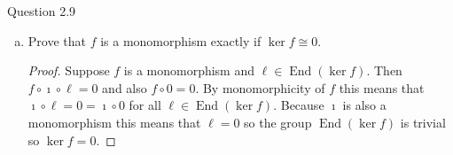 \documentclass{article}
\newcommand{\incl}{\imath}
\DeclareMathOperator{\coker}{coker}
\DeclareMathOperator{\End}{End}
\newenvironment{question}[1][]{\begin{paragraph}{Question #1}}{\end{paragraph}}
\theoremstyle{definition}
\begin{document}
\begin{question}[2.9]
\begin{enumerate}[a)]
\begin{proof}
                  Now consider two morphisms \(g,h:\coker\pi\to Z\) such that
                  \(\pi\circ g=\pi\circ h\) and consider the commutative diagram
                  in .
                  \begin{figure}[H]
                      \[
                          \begin{tikzcd}
                              X && Y && \coker\pi \\
                              \\
                              &&&& Z
                              \arrow["f", from=1-1, to=1-3]
                              \arrow["\pi", from=1-3, to=1-5]
                              \arrow["g"', shift right=1, from=1-5, to=3-5]
                              \arrow["h", shift left=1, from=1-5, to=3-5]
                              \arrow["{g\pi=h\pi}"', from=1-3, to=3-5]
                          \end{tikzcd}
                      \]
                      \caption{Another commutative diagram.}
                      \label{fig:cokernel-universal}
                  \end{figure}
                  Then by the universal property there is a unique map
                  \(\coker\pi\to Z\) such that the diagram commutes. This map
                  must be equal to both \(g\) and \(h\), so \(g=h\) and
                  therefore \(\pi\) is an epimorphism.
              \end{proof}

        \item Prove that \(f\) is a monomorphism exactly if \(\ker f\cong0\).

              \begin{proof}
                  Suppose \(f\) is a monomorphism and \(\ell\in\End(\ker f)\).
                  Then \(f\circ\incl\circ\ell=0\) and also \(f\circ 0=0\). By
                  monomorphicity of \(f\)  this means that
                  \(\incl\circ\ell=0=\incl\circ0\) for all \(\ell\in\End(\ker
                  f)\). Because \(\incl\) is also a monomorphism this means that
                  \(\ell=0\) so the group \(\End(\ker f)\) is trivial so \(\ker
                  f=0\).


\end{proof}
\end{enumerate}
\end{question}
\end{document}
